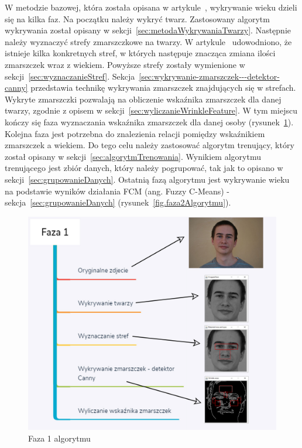 \documentclass[a4paper,twoside,12pt]{book}
\begin{document}
    W metodzie bazowej, która została opisana w artykule~\cite{wrinkleFeatures}, wykrywanie wieku dzieli się na kilka
    faz.
    Na początku należy wykryć twarz.
    Zastosowany algorytm wykrywania został
    opisany w sekcji~\ref{sec:metodaWykrywaniaTwarzy}.
    Następnie należy wyznaczyć strefy zmarszczkowe na twarzy.
    W artykule~\cite{wrinkleFeatures} udowodniono,
    że istnieje kilka konkretnych stref, w których następuje znacząca zmiana ilości zmarszczek wraz z wiekiem.
    Powyższe strefy zostały wymienione w sekcji~\ref{sec:wyznaczanieStref}.
    Sekcja~\ref{sec:wykrywanie-zmarszczek---detektor-canny} przedstawia technikę
    wykrywania zmarszczek znajdujących się w strefach.
    Wykryte zmarszczki
    pozwalają na obliczenie wskaźnika zmarszczek dla danej twarzy, zgodnie z opisem w sekcji~\ref{sec:wyliczanieWrinkleFeature}.
    W tym miejscu kończy się faza wyznaczania wskaźnika zmarszczek dla danej osoby (rysunek~\ref{fig.faza1Algorytmu}).
    Kolejna faza
    jest potrzebna do
    znalezienia relacji pomiędzy wskaźnikiem zmarszczek a wiekiem.
    Do tego celu należy zastosować algorytm trenujący, który
    został opisany w sekcji~\ref{sec:algorytmTrenowania}.
    Wynikiem algorytmu trenującego jest zbiór danych, który
    należy pogrupować, tak jak to opisano w sekcji~\ref{sec:grupowanieDanych}.
    Ostatnią fazą algorytmu jest wykrywanie wieku
    na podstawie wyników działania FCM (ang. Fuzzy C-Means) - sekcja~\ref{sec:grupowanieDanych}
    (rysunek~\ref{fig.faza2Algorytmu}).

    \begin{figure}[ht!]
        \centering
        \includegraphics[width=12cm]{Obrazy/Faza1.jpg}
        \caption{Faza 1 algorytmu}
        \label{fig.faza1Algorytmu}
    \end{figure}
\end{document}
